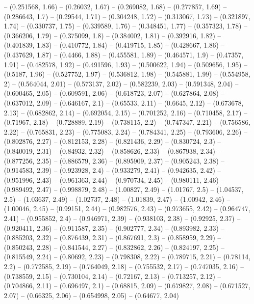 -- (0.251568, 1.66)
-- (0.26032, 1.67)
-- (0.269082, 1.68)
-- (0.277857, 1.69)
-- (0.286643, 1.7)
-- (0.29544, 1.71)
-- (0.304248, 1.72)
-- (0.313067, 1.73)
-- (0.321897, 1.74)
-- (0.330737, 1.75)
-- (0.339589, 1.76)
-- (0.348451, 1.77)
-- (0.357323, 1.78)
-- (0.366206, 1.79)
-- (0.375099, 1.8)
-- (0.384002, 1.81)
-- (0.392916, 1.82)
-- (0.401839, 1.83)
-- (0.410772, 1.84)
-- (0.419715, 1.85)
-- (0.428667, 1.86)
-- (0.437629, 1.87)
-- (0.4466, 1.88)
-- (0.455581, 1.89)
-- (0.464571, 1.9)
-- (0.47357, 1.91)
-- (0.482578, 1.92)
-- (0.491596, 1.93)
-- (0.500622, 1.94)
-- (0.509656, 1.95)
-- (0.5187, 1.96)
-- (0.527752, 1.97)
-- (0.536812, 1.98)
-- (0.545881, 1.99)
-- (0.554958, 2)
-- (0.564044, 2.01)
-- (0.573137, 2.02)
-- (0.582239, 2.03)
-- (0.591348, 2.04)
-- (0.600465, 2.05)
-- (0.609591, 2.06)
-- (0.618723, 2.07)
-- (0.627864, 2.08)
-- (0.637012, 2.09)
-- (0.646167, 2.1)
-- (0.65533, 2.11)
-- (0.6645, 2.12)
-- (0.673678, 2.13)
-- (0.682862, 2.14)
-- (0.692054, 2.15)
-- (0.701252, 2.16)
-- (0.710458, 2.17)
-- (0.71967, 2.18)
-- (0.728889, 2.19)
-- (0.738115, 2.2)
-- (0.747347, 2.21)
-- (0.756586, 2.22)
-- (0.765831, 2.23)
-- (0.775083, 2.24)
-- (0.784341, 2.25)
-- (0.793606, 2.26)
-- (0.802876, 2.27)
-- (0.812153, 2.28)
-- (0.821436, 2.29)
-- (0.830724, 2.3)
-- (0.840019, 2.31)
-- (0.84932, 2.32)
-- (0.858626, 2.33)
-- (0.867938, 2.34)
-- (0.877256, 2.35)
-- (0.886579, 2.36)
-- (0.895909, 2.37)
-- (0.905243, 2.38)
-- (0.914583, 2.39)
-- (0.923928, 2.4)
-- (0.933279, 2.41)
-- (0.942635, 2.42)
-- (0.951996, 2.43)
-- (0.961363, 2.44)
-- (0.970734, 2.45)
-- (0.980111, 2.46)
-- (0.989492, 2.47)
-- (0.998879, 2.48)
-- (1.00827, 2.49)
-- (1.01767, 2.5)
-- (1.04537, 2.5)
-- (1.03637, 2.49)
-- (1.02737, 2.48)
-- (1.01839, 2.47)
-- (1.00942, 2.46)
-- (1.00046, 2.45)
-- (0.99151, 2.44)
-- (0.982576, 2.43)
-- (0.973655, 2.42)
-- (0.964747, 2.41)
-- (0.955852, 2.4)
-- (0.946971, 2.39)
-- (0.938103, 2.38)
-- (0.92925, 2.37)
-- (0.920411, 2.36)
-- (0.911587, 2.35)
-- (0.902777, 2.34)
-- (0.893982, 2.33)
-- (0.885203, 2.32)
-- (0.876439, 2.31)
-- (0.867691, 2.3)
-- (0.858959, 2.29)
-- (0.850243, 2.28)
-- (0.841544, 2.27)
-- (0.832862, 2.26)
-- (0.824197, 2.25)
-- (0.815549, 2.24)
-- (0.80692, 2.23)
-- (0.798308, 2.22)
-- (0.789715, 2.21)
-- (0.78114, 2.2)
-- (0.772585, 2.19)
-- (0.764049, 2.18)
-- (0.755532, 2.17)
-- (0.747035, 2.16)
-- (0.738559, 2.15)
-- (0.730104, 2.14)
-- (0.72167, 2.13)
-- (0.713257, 2.12)
-- (0.704866, 2.11)
-- (0.696497, 2.1)
-- (0.68815, 2.09)
-- (0.679827, 2.08)
-- (0.671527, 2.07)
-- (0.66325, 2.06)
-- (0.654998, 2.05)
-- (0.64677, 2.04)
